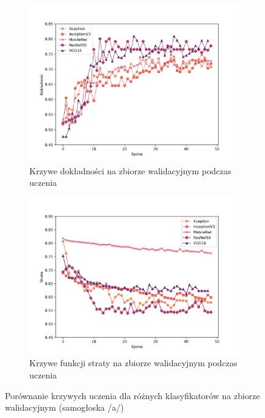 \begin{figure}[ht]
    \centering
    \begin{subfigure}{0.49\textwidth}
        \centering
        \includegraphics[width=\textwidth]{./img/results/a_acc}
        \caption{Krzywe dokładności na zbiorze walidacyjnym podczas uczenia\@}
        \label{fig:a_acc}
    \end{subfigure}
    \begin{subfigure}{0.49\textwidth}
        \centering
        \includegraphics[width=\textwidth]{./img/results/a_loss}
        \caption{Krzywe funkcji straty na zbiorze walidacyjnym podczas uczenia\@}
        \label{fig:a_loss}
    \end{subfigure}

    \caption{Porównanie krzywych uczenia dla różnych klasyfikatorów na zbiorze walidacyjnym (samogłoska /a/)}
    \label{fig:a_results}
\end{figure}

